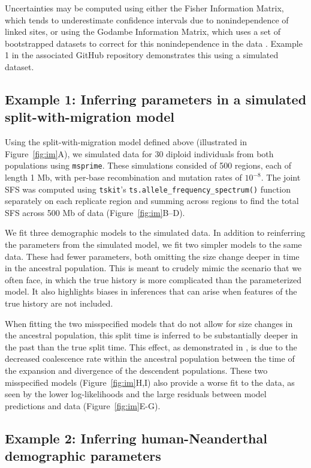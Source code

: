 \documentclass[]{article}
\newcommand{\msprime}{\texttt{msprime}\xspace}
\newcommand{\tskit}{\texttt{tskit}\xspace}
\begin{document}
Uncertainties may be computed using either the Fisher Information Matrix, which
tends to underestimate confidence intervals due to nonindependence of linked
sites, or using the Godambe Information Matrix, which uses a set of
bootstrapped datasets to correct for this nonindependence in the data
\cite{coffman2016computationally}. Example 1 in the associated GitHub
repository demonstrates this using a simulated dataset.

\subsection*{Example 1: Inferring parameters in a simulated split-with-migration model}

Using the split-with-migration model defined above (illustrated in
Figure~\ref{fig:im}A), we simulated data for 30 diploid individuals from both
populations using \msprime \cite{baumdicker2022efficient}. These simulations
consided of 500 regions, each of length 1 Mb, with per-base recombination and
mutation rates of $10^{-8}$. The joint SFS was computed using \tskit's
\texttt{ts.allele\_frequency\_spectrum()} function separately on each replicate
region and summing across regions to find the total SFS across 500 Mb of data
(Figure~\ref{fig:im}B--D).

We fit three demographic models to the simulated data. In addition to
reinferring the parameters from the simulated model, we fit two simpler models
to the same data. These had fewer parameters, both omitting the size change
deeper in time in the ancestral population. This is meant to crudely mimic the
scenario that we often face, in which the true history is more complicated than
the parameterized model. It also highlights biases in inferences that can arise
when features of the true history are not included.

When fitting the two misspecified models that do not allow for size changes in
the ancestral population, this split time is inferred to be substantially
deeper in the past than the true split time. This effect, as demonstrated in
\cite{momigliano2021biases}, is due to the decreased coalescence rate within
the ancestral population between the time of the expansion and divergence of
the descendent populations. These two misspecified models
(Figure~\ref{fig:im}H,I) also provide a worse fit to the data, as seen by the
lower log-likelihoods and the large residuals between model predictions and
data (Figure~\ref{fig:im}E-G).

\subsection*{Example 2: Inferring human-Neanderthal demographic parameters}
\end{document}
